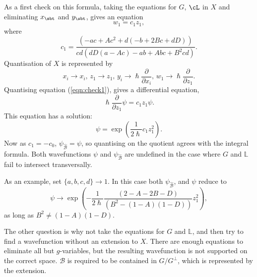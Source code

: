     
    As a first check on this formula, taking the equations for \(G\), \(\cL\) in \(X\) and eliminating \(x_{\sbt}\) and \( y_{\sbt}\), gives an equation
    \begin{equation}
        \label{eqn:check1}
        w_1 = c_1 z_1,
    \end{equation}
    where
    \[ c_1 = \frac{   \left(-a c+A c^2+d (-b+2 B c+d D)\right)}{c d \left(d D (a-A c)-a b+A b c+B^2 c d\right)}. \]
    Quantisation of \(X\) is represented by 
    \[ x_i \rightarrow x_i, \, z_1 \rightarrow z_1, \, y_i \rightarrow \hslash \frac{\partial}{\partial x_i}, \, w_1 \rightarrow \hslash \frac{\partial}{\partial z_1}. \] 
    Quantising equation (\ref{eqn:check1}), gives a differential equation, 
    \[ \hslash \frac{\partial}{\partial z_1} \psi = c_1 z_1 \psi. \]
    This equation has a solution:
    \[ \psi =  \exp\left( \frac{1}{2 \hslash} c_1 z_1^2 \right).\]
    Now as \(c_1 = -c_0\), \( \psi_{\widehat{\mathcal{B}}} = \psi\), so quantising on the quotient agrees with the integral formula.
    Both wavefunctions \( \psi\) and \(\psi_{\widehat{\mathcal{B}}}\) are undefined in the case where \(G\) and \( \mathbb{L}\) fail to intersect transversally.
    
    As an example, set \( \{ a,b,c,d\} \rightarrow 1\). In this case both \(\psi_{\widehat{\mathcal{B}}}\), and \( \psi\) reduce to
    \[ \psi \rightarrow \exp \left( -\frac{1}{2 \hslash } \frac{ (2-A-2 B-D)}{ \left(B^2-(1-A)(1-D)\right)} z_1^2 \right),\]
    as long as \( B^2 \neq (1-A)(1-D)\). 
    
    The other question is why not take the equations for \(G\) and \( \mathbb{L}\), and then try to find a wavefunction without an extension to \(X\). There are enough equations to eliminate all but \(g\)-variables, but the resulting wavefunction is not supported on the correct space. \( \mathcal{B}\) is required to be contained in \(G/G^{\perp}\), which is represented by the extension.
    
